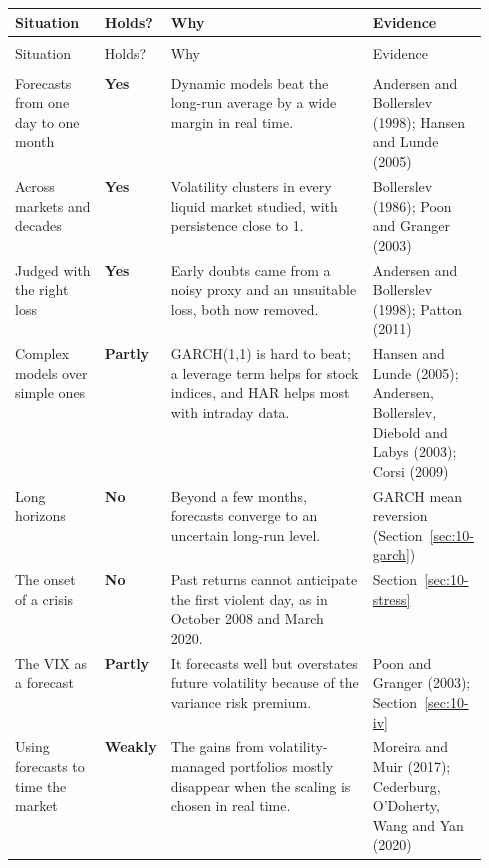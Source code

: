 \begingroup
\small
\setlength{\LTpre}{6pt}\setlength{\LTpost}{6pt}
\begin{longtable}{@{}>{\raggedright\arraybackslash}p{0.19\linewidth}>{\raggedright\arraybackslash}p{0.13\linewidth}>{\raggedright\arraybackslash}p{}>{\raggedright\arraybackslash}p{0.23\linewidth}@{}}
\toprule
Situation & Holds? & Why & Evidence \\
\midrule
\endfirsthead
\multicolumn{4}{@{}l}{\emph{(continued)}} \\
\toprule
Situation & Holds? & Why & Evidence \\
\midrule
\endhead
\midrule
\multicolumn{4}{r@{}}{\emph{(continued on the next page)}} \\
\endfoot
\bottomrule
\endlastfoot
Forecasts from one day to one month & \textbf{Yes} & Dynamic models beat the long-run average by a wide margin in real time. & Andersen and Bollerslev (1998); Hansen and Lunde (2005) \\*
\addlinespace[3pt]
Across markets and decades & \textbf{Yes} & Volatility clusters in every liquid market studied, with persistence close to 1. & Bollerslev (1986); Poon and Granger (2003) \\
\addlinespace[3pt]
Judged with the right loss & \textbf{Yes} & Early doubts came from a noisy proxy and an unsuitable loss, both now removed. & Andersen and Bollerslev (1998); Patton (2011) \\
\addlinespace[3pt]
Complex models over simple ones & \textbf{Partly} & GARCH(1,1) is hard to beat; a leverage term helps for stock indices, and HAR helps most with intraday data. & Hansen and Lunde (2005); Andersen, Bollerslev, Diebold and Labys (2003); Corsi (2009) \\
\addlinespace[3pt]
Long horizons & \textbf{No} & Beyond a few months, forecasts converge to an uncertain long-run level. & GARCH mean reversion (Section~\ref{sec:10-garch}) \\
\addlinespace[3pt]
The onset of a crisis & \textbf{No} & Past returns cannot anticipate the first violent day, as in October 2008 and March 2020. & Section~\ref{sec:10-stress} \\
\addlinespace[3pt]
The VIX as a forecast & \textbf{Partly} & It forecasts well but overstates future volatility because of the variance risk premium. & Poon and Granger (2003); Section~\ref{sec:10-iv} \\*
\addlinespace[3pt]
Using forecasts to time the market & \textbf{Weakly} & The gains from volatility-managed portfolios mostly disappear when the scaling is chosen in real time. & Moreira and Muir (2017); Cederburg, O'Doherty, Wang and Yan (2020) \\
\end{longtable}
\addtocounter{table}{-1}%
\endgroup

